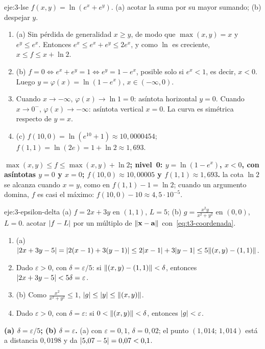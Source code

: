 \begin{solucion}{eje:3-lse}
\datos $f(x,y)=\ln(e^x+e^y)$.
\planteamiento (a) acotar la suma por su mayor sumando; (b) despejar $y$.
\pasos
\begin{enumerate}[label=\arabic*.]
  \item (a) Sin pérdida de generalidad $x\ge y$, de modo que $\max(x,y)=x$ y $e^y\le e^x$. Entonces $e^x\le e^x+e^y\le2e^x$, y como $\ln$ es creciente, $x\le f\le x+\ln2$.
  \item (b) $f=0\iff e^x+e^y=1\iff e^y=1-e^x$, posible solo si $e^x<1$, es decir, $x<0$. Luego $y=\varphi(x)=\ln(1-e^x)$, $x\in(-\infty,0)$.
  \item Cuando $x\to-\infty$, $\varphi(x)\to\ln1=0$: asíntota horizontal $y=0$. Cuando $x\to0^-$, $\varphi(x)\to-\infty$: asíntota vertical $x=0$. La curva es simétrica respecto de $y=x$.
  \item (c) $f(10,0)=\ln(e^{10}+1)\approx10{,}0000454$; $f(1,1)=\ln(2e)=1+\ln2\approx1{,}693$.
\end{enumerate}
\resultado \textbf{$\max(x,y)\le f\le\max(x,y)+\ln2$; nivel~0: $y=\ln(1-e^x)$, $x<0$, con asíntotas $y=0$ y $x=0$; $f(10,0)\approx10{,}00005$ y $f(1,1)\approx1{,}693$.}
\comprobacion la cota $\ln2$ se alcanza cuando $x=y$, como en $f(1,1)-1=\ln2$; cuando un argumento domina, $f$ es casi el máximo: $f(10,0)-10\approx4{,}5\cdot10^{-5}$.
\end{solucion}

\begin{solucion}{eje:3-epsilon-delta}
\datos (a) $f=2x+3y$ en $(1,1)$, $L=5$; (b) $g=\frac{x^2y}{x^2+y^2}$ en $(0,0)$, $L=0$.
\planteamiento acotar $\lvert f-L\rvert$ por un múltiplo de $\lVert\mathbf{x}-\mathbf{a}\rVert$ con~\eqref{eq:t3-coordenada}.
\pasos
\begin{enumerate}[label=\arabic*.]
  \item (a) $\lvert2x+3y-5\rvert=\lvert2(x-1)+3(y-1)\rvert\le2\lvert x-1\rvert+3\lvert y-1\rvert\le5\lVert(x,y)-(1,1)\rVert$.
  \item Dado $\varepsilon>0$, con $\delta=\varepsilon/5$: si $\lVert(x,y)-(1,1)\rVert<\delta$, entonces $\lvert2x+3y-5\rvert<5\delta=\varepsilon$.
  \item (b) Como $\frac{x^2}{x^2+y^2}\le1$, $\lvert g\rvert\le\lvert y\rvert\le\lVert(x,y)\rVert$.
  \item Dado $\varepsilon>0$, con $\delta=\varepsilon$: si $0<\lVert(x,y)\rVert<\delta$, entonces $\lvert g\rvert<\varepsilon$.
\end{enumerate}
\resultado \textbf{(a) $\delta=\varepsilon/5$; (b) $\delta=\varepsilon$.}
\comprobacion (a) con $\varepsilon=0{,}1$, $\delta=0{,}02$; el punto $(1{,}014;\,1{,}014)$ está a distancia $0{,}0198$ y da $\lvert5{,}07-5\rvert=0{,}07<0{,}1$.
\end{solucion}

